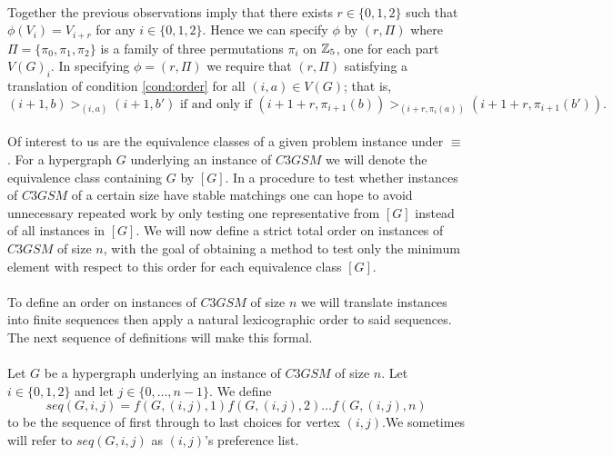 \paragraph{}
Together the previous observations imply that there exists $r \in \{0,1,2\}$ such that $\phi(V_i) = V_{i+r}$ for any $i \in\{0,1,2\}$. Hence we can specify $\phi$ by $(r,\Pi)$ where $\Pi = \{\pi_0, \pi_1,\pi_2\}$ is a family of three permutations $\pi_i$ on $\mathbb{Z}_5$, one for each part $V(G)_i$. In specifying $\phi=(r,\Pi)$ we require that $(r,\Pi)$ satisfying a translation of condition \ref{cond:order} for all $(i,a) \in V(G)$; that is, 
\begin{equation}\label{cond:orderT}
(i+1,b) >_{(i,a)} (i+1, b') \text{ if and only if } (i+1+r, \pi_{i+1}(b)) >_{(i+r,\pi_i(a))} (i+1+r, \pi_{i+1}(b')).
\end{equation}
\paragraph{}
Of interest to us are the equivalence classes of a given problem instance under $\equiv$. For a hypergraph $G$ underlying an instance of $C3GSM$ we will denote the equivalence class containing $G$ by $[G]$. In a procedure to test whether instances of $C3GSM$ of a certain size have stable matchings one can hope to avoid unnecessary repeated work by only testing one representative from $[G]$ instead of all instances in $[G]$. We will now define a strict total order on instances of $C3GSM$ of size $n$, with the goal of obtaining a method to test only the minimum element with respect to this order for each equivalence class $[G]$.
\paragraph{}
To define an order on instances of $C3GSM$ of size $n$ we will translate instances into finite sequences then apply a natural lexicographic order to said sequences. The next sequence of definitions will make this formal.

\paragraph{}Let $G$ be a hypergraph underlying an instance of $C3GSM$ of size $n$. Let $i \in \{0,1,2\}$ and let $j \in \{0,\dots,n-1\}$. We define
$$seq(G,i,j) = f(G,(i,j),1)f(G,(i,j),2)\dots f(G,(i,j),n)$$
to be the sequence of first through to last choices for vertex $(i,j)$.We sometimes will refer to $seq(G,i,j)$ as $(i,j)$'s preference list.

